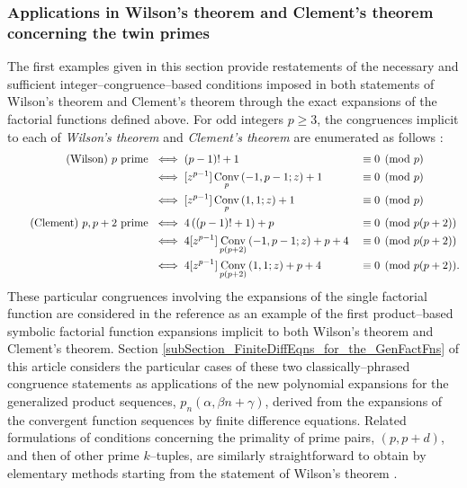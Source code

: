 \documentclass[12pt,reqno]{article}
\numberwithin{sfootnote}{section}
\numberwithin{equation}{section}
\theoremstyle{plain}
\theoremstyle{definition}
\theoremstyle{remark}
\newcommand{\pn}[3]{\ensuremath{p_{#1}\left(#2, #3\right)}}
\newcommand{\ConvGF}[4]{\ensuremath{\Conv_{#1}\left(#2, #3; #4\right)}}
\DeclareMathOperator{\Conv}{Conv}
\begin{document}
\subsubsection{Applications in Wilson's theorem and 
               Clement's theorem concerning the twin primes} 

The first examples given in this section provide restatements of the 
necessary and sufficient integer--congruence--based conditions 
imposed in both statements of Wilson's theorem and Clement's theorem 
through the exact expansions of the factorial functions defined above. 
For odd integers $p \geq 3$, the congruences 
implicit to each of \emph{Wilson's theorem} and \emph{Clement's theorem} 
are enumerated as follows 
\citep[\S 4.3]{PRIMEREC} \citep[\S 6.6]{HARDYWRIGHTNUMT} \citep{CLEMENTPRIMES}: 
\begin{align} 
\tag{Wilson} 
\text{ $p$ prime } & \iff (p-1)! + 1 && \equiv 0 \pmod{p} \\ 
\notag 
   & \iff 
     [z^{p-1}] \ConvGF{p}{-1}{p-1}{z} + 1 && \equiv 0 \pmod{p} \\ 
\notag 
   & \iff 
     [z^{p-1}] \ConvGF{p}{1}{1}{z} + 1 && \equiv 0 \pmod{p} \\ 
\tag{Clement} 
\text{ $p, p+2$ prime } & \iff 
     4\left((p-1)! + 1\right) + p && \equiv 0 \pmod{p(p+2)} \\ 
\notag 
   & \iff 
     4 [z^{p-1}] \ConvGF{p(p+2)}{-1}{p-1}{z} + p + 4 && \equiv 0 \pmod{p(p+2)} \\ 
\notag 
   & \iff 
     4 [z^{p-1}] \ConvGF{p(p+2)}{1}{1}{z} + p + 4 && \equiv 0 \pmod{p(p+2)}. 
\end{align} 
These particular congruences involving the expansions of the 
single factorial function are considered in the reference 
\citep[\S 6.1.6]{MULTIFACTJIS} as an example of the 
first product--based symbolic factorial function expansions implicit to both 
Wilson's theorem and Clement's theorem. 
Section \ref{subSection_FiniteDiffEqns_for_the_GenFactFns} 
of this article considers the particular cases of 
these two classically--phrased congruence statements as 
applications of the new polynomial expansions for the 
generalized product sequences, $\pn{n}{\alpha}{\beta n+\gamma}$, 
derived from the expansions of the 
convergent function sequences by finite difference equations. 
Related formulations of conditions concerning the 
primality of prime pairs, $(p, p+d)$, and then of 
other prime $k$--tuples, 
are similarly straightforward to obtain by elementary methods 
starting from the statement of Wilson's theorem 
\citep{ONWTHM-AND-POLIGNAC-CONJ}. 
\end{document}
